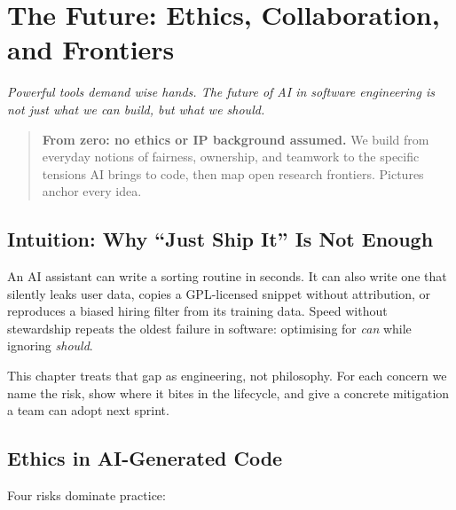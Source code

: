 \chapter{The Future: Ethics, Collaboration, and Frontiers}\label{ch:future}
\begin{center}\small\textit{Powerful tools demand wise hands. The future of AI in software engineering is not just what we can build, but what we should.}\end{center}

\begin{quote}\small\textbf{From zero: no ethics or IP background assumed.} We build from everyday notions of fairness, ownership, and teamwork to the specific tensions AI brings to code, then map open research frontiers. Pictures anchor every idea.\end{quote}

\noindent{}
\vspace{0.4em}

\section{Intuition: Why ``Just Ship It'' Is Not Enough}\label{sec:why-ethics}
An AI assistant can write a sorting routine in seconds. It can also write one that silently leaks user data, copies a GPL-licensed snippet without attribution, or reproduces a biased hiring filter from its training data. Speed without stewardship repeats the oldest failure in software: optimising for \emph{can} while ignoring \emph{should}.

This chapter treats that gap as engineering, not philosophy. For each concern we name the risk, show where it bites in the lifecycle, and give a concrete mitigation a team can adopt next sprint.

\section{Ethics in AI-Generated Code}\label{sec:ethics}
Four risks dominate practice:

